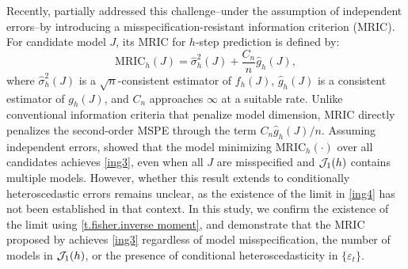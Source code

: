\documentclass[ejsv2]{imsart}
\theoremstyle{plain}
\theoremstyle{definition}
\theoremstyle{remark}
\begin{document}
Recently, \cite{Hsu2019} partially addressed this challenge--under the assumption of independent errors--by introducing a misspecification-resistant information criterion (MRIC).
For candidate model $J$, its MRIC for $h$-step
prediction is defined by:
\begin{equation}\label{MRIC0}
\textrm{MRIC}_{h}(J)=\hat{\sigma}^2_{h}(J)+\frac{C_n}{n}\hat{g}_h(J),
\end{equation}
where 
$\hat{\sigma}^2_{h}(J)$ 
is a $\sqrt{n}$-consistent estimator
of $f_{h}(J)$, 
$\hat{g}_h(J)$ is a consistent estimator
of $g_h(J)$, and $C_n$ approaches $\infty$
at a suitable rate. 
Unlike conventional information criteria
that penalize model dimension,
MRIC directly penalizes the second-order MSPE through the term
$C_n\hat{g}_h(J)/n$.
Assuming independent errors, 
\cite{Hsu2019} showed
that the model minimizing MRIC$_{h} (\cdot)$ over all candidates achieves
\eqref{ing3}, even when all $J$ are misspecified and ${\cal J}_{1}(h)$ contains multiple models.
However, whether this result extends to conditionally heteroscedastic errors remains unclear, as the existence of the limit in 
\eqref{ing4} 
has not been established in that context.
In this study, we confirm the existence of the limit 
using \eqref{t.fisher.inverse moment}, and demonstrate that the MRIC proposed by \cite{Hsu2019}
achieves \eqref{ing3}
regardless of model misspecification, the number of models in
${\cal J}_{1}(h)$, or
the presence of conditional heteroscedasticity in $\{\varepsilon_t\}$.



\end{document}

